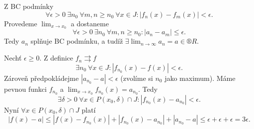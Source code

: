 \documentclass[12pt]{article}					%
\begin{document}

	\begin{dukaz}
		Z BC podmínky
		$$ \forall \epsilon > 0\ \exists n_0\ \forall m, n ≥ n_0\ \forall x \in J: |f_n(x) - f_m(x)| < \epsilon. $$
		Provedeme $\lim_{x \rightarrow x_0}$ a dostaneme
		$$ \forall \epsilon > 0\ \exists n_0\ \forall m, n ≥ n_0: |a_n - a_m| ≤ \epsilon. $$
		Tedy $a_n$ splňuje BC podmínku, a tudíž $\exists \lim_{n \rightarrow ∞} a_n = a \in ®R$.

		Nechť $\epsilon ≥ 0$. Z definice $f_n \rightrightarrows f$
		$$ \exists n_0\ \forall x \in J: |f_{n_0}(x) - f(x)| < \epsilon. $$
		Zároveň předpokládejme $|a_{n_0} - a| < \epsilon$ (zvolíme si $n_0$ jako maximum). Máme pevnou funkci $f_{n_0}$ a $\lim_{x \rightarrow x_0} f_{n_0}(x) = a_{n_0}$. Tedy
		$$ \exists \delta > 0\ \forall x \in P(x_0, \delta) \cap J: |f_{n_0}(x) - a_{n_0}| < \epsilon. $$
		Nyní $\forall x \in P(x_0, \delta) \cap J$ platí
		$$ |f(x) - a| ≤ |f(x) - f_{n_0}(x)| + |f_{n_0}(x) - a_{n_0}| + |a_{n_0} - a| ≤ \epsilon + \epsilon + \epsilon = 3 \epsilon. $$
	\end{dukaz}
\end{document}
